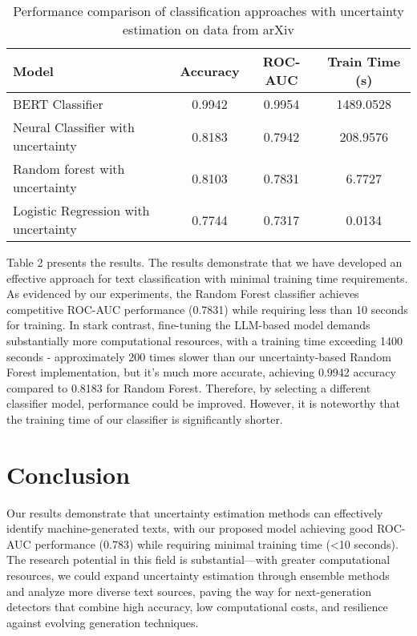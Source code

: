 \documentclass[a4paper, 12pt]{article}
\begin{document}
\begin{table}[ht]
\centering
\begin{tabular}{|l|c|c|c|}
\hline
\textbf{Model} & \textbf{Accuracy} & \textbf{ROC-AUC} & \textbf{Train Time (s)} \\
\hline
BERT Classifier & 0.9942 & 0.9954 & 1489.0528 \\
Neural Classifier with uncertainty & 0.8183 & 0.7942 & 208.9576 \\
Random forest with uncertainty & 0.8103 & 0.7831 & 6.7727 \\
Logistic Regression with uncertainty & 0.7744 & 0.7317 & 0.0134 \\
\hline
\end{tabular}
\caption{Performance comparison of classification approaches with uncertainty estimation on data from arXiv}
\label{tab:model-performance}
\end{table}

Table 2 presents the results. The results demonstrate that we have developed an effective approach for text classification with minimal training time requirements. As evidenced by our experiments, the Random Forest classifier achieves competitive ROC-AUC performance (0.7831) while requiring less than 10 seconds for training. In stark contrast, fine-tuning the LLM-based model demands substantially more computational resources, with a training time exceeding 1400 seconds - approximately 200 times slower than our uncertainty-based Random Forest implementation, but it’s much more accurate, achieving  0.9942 accuracy compared to 0.8183 for Random Forest. Therefore, by selecting a different classifier model, performance could be improved. However, it is noteworthy that the training time of our classifier is significantly shorter.

\section{Conclusion}

Our results demonstrate that uncertainty estimation methods can effectively identify machine-generated texts, with our proposed model achieving good ROC-AUC performance (0.783) while requiring minimal training time (<10 seconds). The research potential in this field is substantial—with greater computational resources, we could expand uncertainty estimation through ensemble methods and analyze more diverse text sources, paving the way for next-generation detectors that combine high accuracy, low computational costs, and resilience against evolving generation techniques.



\end{document}
